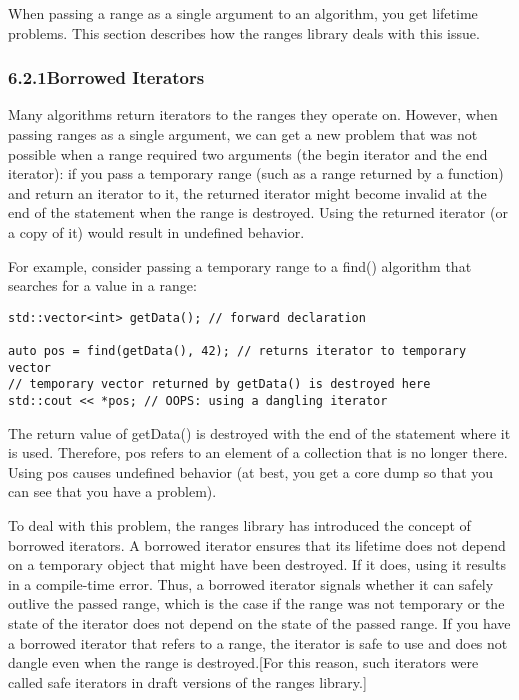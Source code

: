 

When passing a range as a single argument to an algorithm, you get lifetime problems. This section describes how the ranges library deals with this issue.

\subsubsection*{ 6.2.1\hspace{0.2cm}Borrowed Iterators}

Many algorithms return iterators to the ranges they operate on. However, when passing ranges as a single argument, we can get a new problem that was not possible when a range required two arguments (the begin iterator and the end iterator): if you pass a temporary range (such as a range returned by a function) and return an iterator to it, the returned iterator might become invalid at the end of the statement when the range is destroyed. Using the returned iterator (or a copy of it) would result in undefined behavior.

For example, consider passing a temporary range to a find() algorithm that searches for a value in a range:

\begin{lstlisting}[style=styleCXX]
std::vector<int> getData(); // forward declaration

auto pos = find(getData(), 42); // returns iterator to temporary vector
// temporary vector returned by getData() is destroyed here
std::cout << *pos; // OOPS: using a dangling iterator
\end{lstlisting}

The return value of getData() is destroyed with the end of the statement where it is used. Therefore, pos refers to an element of a collection that is no longer there. Using pos causes undefined behavior (at best, you get a core dump so that you can see that you have a problem).

To deal with this problem, the ranges library has introduced the concept of borrowed iterators. A borrowed iterator ensures that its lifetime does not depend on a temporary object that might have been destroyed. If it does, using it results in a compile-time error. Thus, a borrowed iterator signals whether it can safely outlive the passed range, which is the case if the range was not temporary or the state of the iterator does not depend on the state of the passed range. If you have a borrowed iterator that refers to a range, the iterator is safe to use and does not dangle even when the range is destroyed.[For this reason, such iterators were called safe iterators in draft versions of the ranges library.] 

